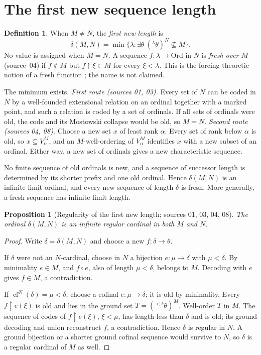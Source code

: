 \documentclass[11pt,letterpaper]{article}
\numberwithin{equation}{section}
\newtheorem{proposition}[proposition]{Proposition}
\theoremstyle{definition}
\newtheorem{definition}[definition]{Definition}
\theoremstyle{remark}
\newcommand{\Ord}{\mathrm{Ord}}
\newcommand{\cf}{\operatorname{cf}}
\newcommand{\res}{\mathbin{\upharpoonright}}
\begin{document}
\section{The first new sequence length}\label{univ:sec:delta}

\begin{definition}\label{univ:def:delta}
When $M\ne N$, the \emph{first new length} is
\begin{equation}\label{univ:eq:delta}
 \delta(M,N)=\min\{\lambda:\exists\theta\
 ({}^\lambda\theta)^N\not\subseteq M\}.
\end{equation}
No value is assigned when $M=N$. A sequence $f:\lambda\to\Ord$ in $N$ is
\emph{fresh over $M$} (source~04) if $f\notin M$ but $f\res\xi\in M$ for every
$\xi<\lambda$. This is the forcing-theoretic notion of a fresh function
\cite{FKW}; the name is not claimed.
\end{definition}

The minimum exists. \emph{First route (sources 01, 03).} Every set of $N$ can
be coded in $N$ by a well-founded extensional relation on an ordinal together
with a marked point, and such a relation is coded by a set of ordinals. If
all sets of ordinals were old, the code and its Mostowski collapse would be
old, so $M=N$. \emph{Second route (sources 04, 08).} Choose a new set $x$ of
least rank $\alpha$. Every set of rank below $\alpha$ is old, so
$x\subseteq V_\alpha^M$, and an $M$-well-ordering of $V_\alpha^M$ identifies
$x$ with a new subset of an ordinal. Either way, a new set of ordinals gives a
new characteristic sequence.

No finite sequence of old ordinals is new, and a sequence of successor length
is determined by its shorter prefix and one old ordinal. Hence
$\delta(M,N)$ is an infinite limit ordinal, and every new sequence of length
$\delta$ is fresh. More generally, a fresh sequence has infinite limit length.

\begin{proposition}[Regularity of the first new length; sources 01, 03, 04, 08]\label{univ:prop:deltaregular}
The ordinal $\delta(M,N)$ is an infinite regular cardinal in both $M$ and $N$.
\end{proposition}
\begin{proof}
Write $\delta=\delta(M,N)$ and choose a new $f:\delta\to\theta$.

If $\delta$ were not an $N$-cardinal, choose in $N$ a bijection
$e:\mu\to\delta$ with $\mu<\delta$. By minimality $e\in M$, and $f\circ e$,
also of length $\mu<\delta$, belongs to $M$. Decoding with $e$ gives $f\in M$,
a contradiction.

If $\cf^N(\delta)=\mu<\delta$, choose a cofinal $e:\mu\to\delta$; it is old by
minimality. Every $f\res e(\xi)$ is old and lies in the ground set
$T=({}^{<\delta}\theta)^M$. Well-order $T$ in $M$. The sequence of codes of
$f\res e(\xi)$, $\xi<\mu$, has length less than $\delta$ and is old; its ground
decoding and union reconstruct $f$, a contradiction. Hence $\delta$ is regular
in $N$. A ground bijection or a shorter ground cofinal sequence would survive
to $N$, so $\delta$ is a regular cardinal of $M$ as well.
\end{proof}
\end{document}
